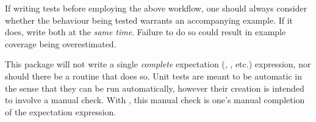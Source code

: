 If writing tests before employing the above workflow, one should always consider whether the behaviour being tested warrants an accompanying example. If it does, write both at the \emph{same time}. Failure to do so could result in example coverage being overestimated.


This package will not write a single \emph{complete} expectation (, , etc.) expression, nor should there be a routine that does so. Unit tests are meant to be automatic in the sense that they can be run automatically, however their creation is intended to involve a manual check. With , this manual check is one's manual completion of the expectation expression.



\address{Rory Nolan\\
  Wellcome Trust Centre for Human Genetics, University of Oxford\\
  OX3 7BN\\
  United Kingdom\\}

\address{Sergi Padilla-Parra\\
  Wellcome Trust Centre for Human Genetics and Division of Structural Biology, University of Oxford\\
  OX3 7BN\\
  United Kingdom\\}
